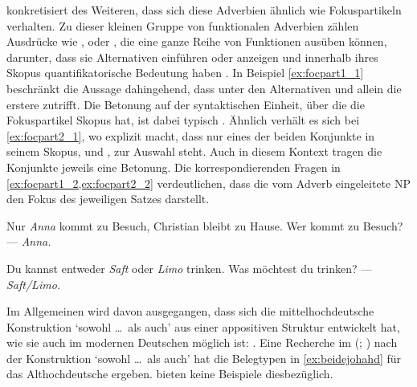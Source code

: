 \citet[425--428]{johannessen2005} konkretisiert des Weiteren, dass sich diese
Adverbien ähnlich wie Fokuspartikeln verhalten. Zu dieser kleinen Gruppe von
funktionalen Adverbien zählen Ausdrücke wie ,  oder
, die eine ganze Reihe von Funktionen ausüben können, darunter, dass
sie Alternativen einführen oder anzeigen und innerhalb ihres Skopus
quantifikatorische Bedeutung haben \autocite[vgl.][1--4, 15]{koenig1991}. In
Beispiel \cref{ex:focpart1_1} beschränkt  die Aussage dahingehend, dass
unter den Alternativen  und  allein die erstere
zutrifft. Die Betonung auf der syntaktischen Einheit, über die die
Fokuspartikel Skopus hat, ist dabei typisch \autocite[10--14]{koenig1991}.
Ähnlich verhält es sich bei \cref{ex:focpart2_1}, wo  explizit
macht, dass nur eines der beiden Konjunkte in seinem Skopus,  und
, zur Auswahl steht. Auch in diesem Kontext tragen die Konjunkte
jeweils eine Betonung. Die korrespondierenden Fragen in
\cref{ex:focpart1_2,ex:focpart2_2} verdeutlichen, dass die vom Adverb
eingeleitete NP den Fokus des jeweiligen Satzes darstellt.

\begin{exe}
\ex\label{ex:focpart_1}
\begin{xlist}
	\ex \label{ex:focpart1_1}
		Nur \emph{Anna} kommt zu Besuch, Christian bleibt zu
		Hause.
	\ex \label{ex:focpart1_2}
		Wer kommt zu Besuch? --- \emph{Anna.}
\end{xlist}

\ex \begin{xlist}
	\ex \label{ex:focpart2_1}
		Du kannst entweder \emph{Saft} oder \emph{Limo} trinken.
	\ex \label{ex:focpart2_2}
		Was möchtest du trinken? --- \emph{Saft/Limo.}
\end{xlist}
\end{exe}

Im Allgemeinen wird davon ausgegangen, dass sich die mittelhochdeutsche
Konstruktion  `sowohl \dots\ als auch' aus einer
appositiven Struktur entwickelt hat, wie sie auch im modernen Deutschen möglich
ist:  \autocite[vgl.][626--627 und die dortigen
Referenzen]{ksw2}. Eine Recherche im  (;
\nosh\cite{ddd}) nach der Konstruktion  `sowohl
\dots\ als auch' \autocite[vgl.][49]{schuetzeichel2012} hat die Belegtypen in
\cref{ex:beidejohahd} für das Althochdeutsche ergeben.
\citet{braune2018,schrodt2004} bieten keine Beispiele dies\-bezüglich.


